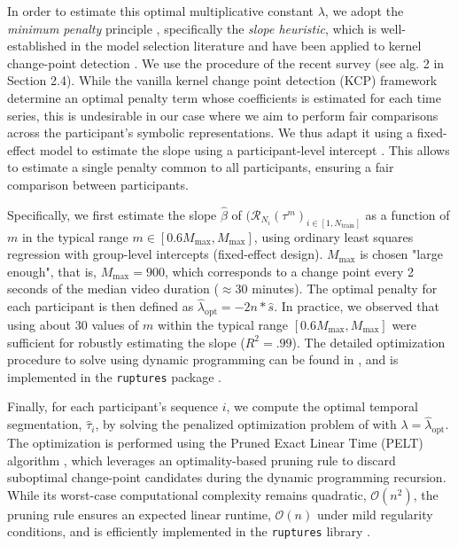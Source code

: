         In order to estimate this optimal multiplicative constant $\lambda$, we adopt the \emph{minimum penalty} principle \cite{slop_heuristics_survey}, specifically the \emph{slope heuristic}, which is well-established in the model selection literature \cite{Baudry2011, Lavielle2005, JMLR:v10:arlot09a, lebar2002} and have been applied to kernel change-point detection \cite{CELISSE2018200, cpt, NIPS2008_08b255a5}. We use the procedure of the recent survey \cite{slop_heuristics_survey} (see alg. 2 in Section 2.4). While the vanilla kernel change point detection (KCP) framework determine an optimal penalty term whose coefficients is estimated for each time series, this is undesirable in our case where we aim to perform fair comparisons across the participant's symbolic representations. We thus adapt it using a fixed-effect model to estimate the slope using a participant-level intercept \cite{10.5555/1162264}. This allows to estimate a single penalty common to all participants, ensuring a fair comparison between participants. 

        
        Specifically, we first estimate the slope $\hat{\beta}$ of $(\mathcal{R}_{N_i}({\tau^{m}})_{i\in[1, N_{\text{train}}]}$ as a function of $m$ in the typical range $m \in [0.6 M_{\text{max}}, M_{\text{max}}]$, using ordinary least squares regression with group-level intercepts (fixed-effect design). $M_{\text{max}}$ is chosen "large enough", that is, $M_{\text{max}} = 900$, which corresponds to a change point every 2 seconds of the median video duration ($\approx 30$ minutes). The optimal penalty for each participant is then defined as $\hat{\lambda}_{\text{opt}} = -2n*\hat{s}$. In practice, we observed that using about $30$ values of $m$ within the typical range $[0.6 M_{\text{max}}, M_{\text{max}}]$ were sufficient for robustly estimating the slope ($R^2 =.99$). The detailed optimization procedure to solve  using dynamic programming can be found in \cite{cpt}, and is implemented in the \texttt{ruptures} package \cite{ruptures}. %

        Finally, for each participant's sequence $i$, we compute the optimal temporal segmentation, $\hat{\tau}_{i}$, by solving the penalized optimization problem of  with $\lambda = \hat{\lambda}_{\text{opt}}$. The optimization is performed using the Pruned Exact Linear Time (PELT) algorithm \cite{pelt}, which leverages an optimality-based pruning rule to discard suboptimal change-point candidates during the dynamic programming recursion. While its worst-case computational complexity remains quadratic, $\mathcal{O}(n^2)$, the pruning rule ensures an expected linear runtime, $\mathcal{O}(n)$ under mild regularity conditions, and is efficiently implemented in the \texttt{ruptures} library \cite{ruptures}.


